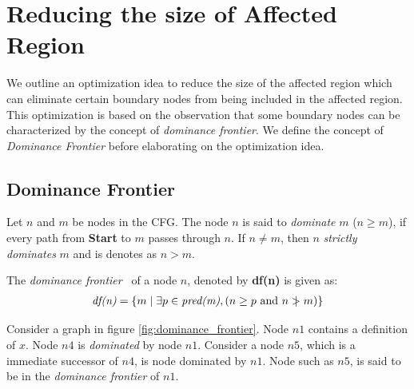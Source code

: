 \documentclass[11pt,a4paper,openright]{report}
\newcommand{\ngtr}{%
 \mathrel{\ooalign{$>$\cr\hidewidth$|$\hidewidth}}%
}
\begin{document}
\section{Reducing the size of Affected Region}
We outline an optimization idea to reduce the size of the affected region which can 
eliminate certain boundary nodes from being included in the affected region.
This optimization is based on the observation that some boundary nodes can be characterized
by the concept of \emph{dominance frontier}. We define the concept of \textit{Dominance Frontier} before elaborating on the optimization idea.

\subsection*{Dominance Frontier}

Let $n$ and $m$ be nodes in the CFG. The node $n$ is said to \textit{dominate} $m$ ($n\geq m$), if every path from \textbf{Start} to $m$ passes through $n$.
If $n \neq m$, then $n$ \textit{strictly dominates} $m$ and is denotes as $n > m$.  

The \textit{dominance frontier}~\cite{book} of a node $n$, denoted by \textbf{df(n)} is given as:
\begin{equation}
\begin{split}
\mbox{\textit{df(n)}} &= \{ m \mid \exists p \in \textit{pred(m)}, ( n \geq p \mbox{ and } n \ngtr m )\} \\	  
\end{split} 
\end{equation}

Consider a graph in figure \ref{fig:dominance_frontier}. Node $n1$ contains a definition of $x$. Node $n4$ is \textit{dominated} by node $n1$. Consider a node $n5$, which is a 
immediate successor of $n4$, is node dominated by $n1$. Node such as $n5$, is said to be in the \textit{dominance frontier} of $n1$. 
\end{document}
